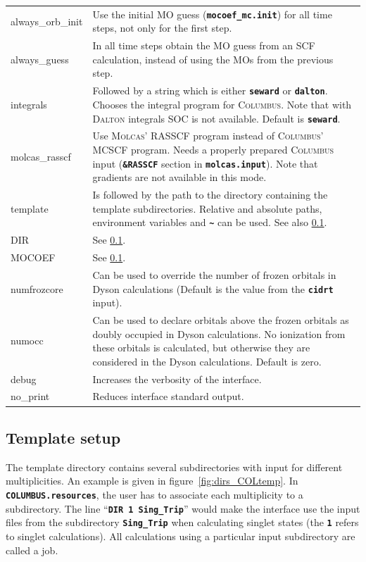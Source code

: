 \documentclass[a4paper,10pt,DIV=15,openany,twoside=false]{scrbook}
\newcommand{\ttt}[1]{\textbf{\texttt{#1}}}
\begin{document}
\begin{longtable}{>{\ttfamily}lp{12cm}}
always\_orb\_init    &Use the initial MO guess (\ttt{mocoef\_mc.init}) for all time steps, not only for the first step.\\
always\_guess     &In all time steps obtain the MO guess from an SCF calculation, instead of using the MOs from the previous step.\\
integrals       &Followed by a string which is either \ttt{seward} or \ttt{dalton}. Chooses the integral program for \textsc{Columbus}. Note that with \textsc{Dalton} integrals SOC is not available. Default is \ttt{seward}.\\
molcas\_rasscf  &Use \textsc{Molcas}' RASSCF program instead of \textsc{Columbus}' MCSCF program. Needs a properly prepared \textsc{Columbus} input (\ttt{\&RASSCF} section in \ttt{molcas.input}). Note that gradients are not available in this mode.\\
template        &Is followed by the path to the directory containing the template subdirectories. Relative and absolute paths, environment variables and \ttt{\textasciitilde} can be used. See also \ref{int:col:template}.\\
DIR             &See \ref{int:col:template}.\\
MOCOEF          &See \ref{int:col:template}.\\
numfrozcore           &Can be used to override the number of frozen orbitals in Dyson calculations (Default is the value from the \ttt{cidrt} input).\\
numocc           &Can be used to declare orbitals above the frozen orbitals as doubly occupied in Dyson calculations. No ionization from these orbitals is calculated, but otherwise they are considered in the Dyson calculations. Default is zero.\\
  debug           &Increases the verbosity of the interface.\\
  no\_print       &Reduces interface standard output.\\
\end{longtable}



\subsection{Template setup}\label{int:col:template}

The template directory contains several subdirectories with input for different multiplicities. An example is given in figure~\ref{fig:dirs_COLtemp}. In \ttt{COLUMBUS.resources}, the user has to associate each multiplicity to a subdirectory. The line ``\ttt{DIR 1 Sing\_Trip}'' would make the interface use the input files from the subdirectory \ttt{Sing\_Trip} when calculating singlet states (the \ttt{1} refers to singlet calculations). All calculations using a particular input subdirectory are called a job.
\end{document}

